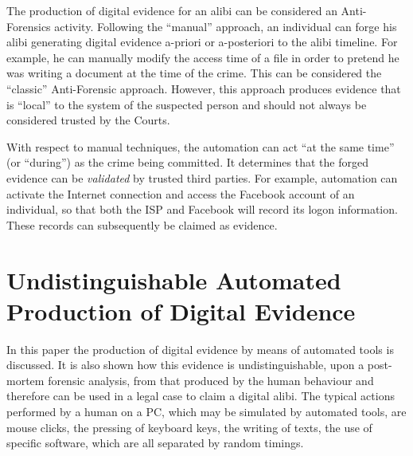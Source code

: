 \documentclass[runningheads]{llncs}
\begin{document}
The production of digital evidence for an alibi can be considered an Anti-Forensics activity. Following the ``manual'' approach, an individual can forge his alibi generating digital evidence a-priori or a-posteriori to the alibi timeline. For example, he can manually modify the access time of a file in order to pretend he was writing a document at the time of the crime. This can be considered the ``classic'' Anti-Forensic approach. However, this approach produces evidence that is ``local'' to the system of the suspected person and should not always be considered trusted by the Courts.

With respect to manual techniques, the automation can act ``at the same time'' (or ``during'') as the crime being committed. It determines that the forged evidence can be \emph{validated} by trusted third parties. For example,  automation can activate the Internet connection and access the Facebook account of an individual, so that both the ISP and Facebook will record its logon information. These records can subsequently be claimed as evidence.

\section{Undistinguishable Automated Production of Digital Evidence}
\label{sec:undistingushable}

In this paper the production of digital evidence by means of automated tools is discussed.
It is also shown how this evidence is undistinguishable, upon a post-mortem forensic analysis, from that produced by the human behaviour and therefore can be used in a legal case to claim a digital alibi.
The typical actions performed by a human on a PC, which may be
simulated by automated tools, are mouse clicks, the pressing of keyboard keys,
the writing of texts, the use of specific software, which are all separated by random timings.
\end{document}
